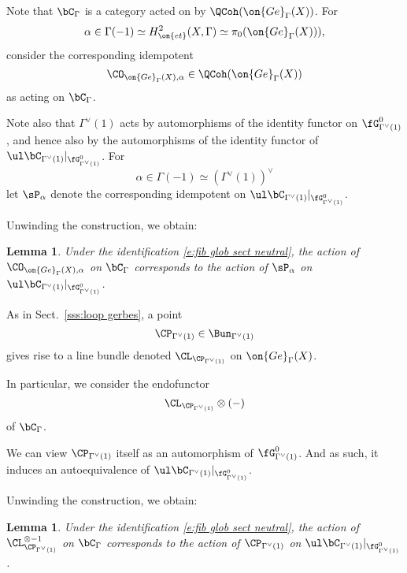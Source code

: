 \documentclass[9pt]{amsart}
\newtheorem{lem}[subsubsection]{Lemma}
\theoremstyle{remark}
\theoremstyle{definition}
\theoremstyle{remark}
\newcommand{\secref}[1]{Sect.~\ref{#1}}
\numberwithin{equation}{section}
\begin{document}
\sssec{}

Note that $\bC_\Gamma$ is a category acted on by $\QCoh(\on{Ge}_{\Gamma}(X))$. For 
$$\alpha \in \Gamma(-1)\simeq H^2_{\on{et}}(X,\Gamma)\simeq \pi_0(\on{Ge}_{\Gamma}(X))),$$
consider the corresponding idempotent
$$\CO_{\on{Ge}_{\Gamma}(X),\alpha}\in \QCoh(\on{Ge}_{\Gamma}(X))$$
as acting on $\bC_\Gamma$. 

\medskip

Note also that $\Gamma^\vee(1)$ acts by automorphisms of the identity functor on $\fG^0_{\Gamma^\vee(1)}$, and hence
also by the automorphisms of the identity functor of $\ul\bC_{\Gamma^\vee(1)}|_{\fG^0_{\Gamma^\vee(1)}}$. For
$$\alpha\in \Gamma(-1)\simeq (\Gamma^\vee(1))^\vee$$ 
let $\sP_\alpha$ denote the corresponding idempotent on $\ul\bC_{\Gamma^\vee(1)}|_{\fG^0_{\Gamma^\vee(1)}}$.

\medskip

Unwinding the construction, we obtain:

\begin{lem} \label{l:Hecke 0 abs}
Under the identification \eqref{e:fib glob sect neutral}, the action of $\CO_{\on{Ge}_{\Gamma}(X),\alpha}$ on $\bC_\Gamma$
corresponds to the action of
$\sP_\alpha$ on $\ul\bC_{\Gamma^\vee(1)}|_{\fG^0_{\Gamma^\vee(1)}}$. 
\end{lem} 

\sssec{}

As in \secref{sss:loop gerbes}, a point 
$$\CP_{\Gamma^\vee(1)}\in \Bun_{\Gamma^\vee(1)}$$
gives rise to a line bundle denoted $\CL_{\CP_{\Gamma^\vee(1)}}$ on $\on{Ge}_{\Gamma}(X)$. 

\medskip

In particular, we consider the endofunctor 
$$\CL_{\CP_{\Gamma^\vee(1)}}\otimes (-)$$
of  $\bC_\Gamma$.

\medskip

We can view $\CP_{\Gamma^\vee(1)}$ itself as an automorphism of $\fG^0_{\Gamma^\vee(1)}$. And as such, it induces an 
autoequivalence of $\ul\bC_{\Gamma^\vee(1)}|_{\fG^0_{\Gamma^\vee(1)}}$.

\medskip

Unwinding the construction, we obtain:

\begin{lem} \label{l:Hecke 1 abs}
Under the identification \eqref{e:fib glob sect neutral}, the action of $\CL^{\otimes -1}_{\CP_{\Gamma^\vee(1)}}$ on $\bC_\Gamma$
corresponds to the action of $\CP_{\Gamma^\vee(1)}$ on $\ul\bC_{\Gamma^\vee(1)}|_{\fG^0_{\Gamma^\vee(1)}}$.
\end{lem} 
\end{document}
